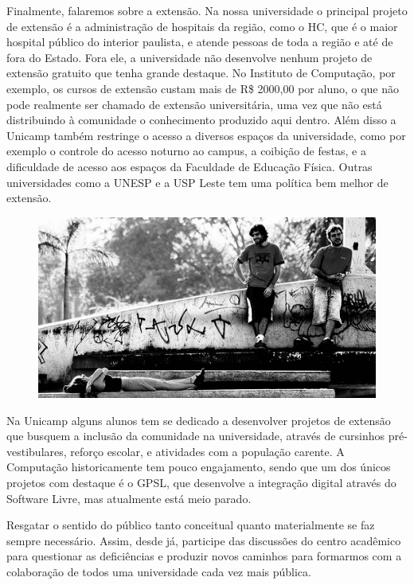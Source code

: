 Finalmente, falaremos sobre a extensão. Na nossa universidade o principal
projeto de extensão é a administração de hospitais da região, como o HC, que
é o maior hospital público do interior paulista, e atende pessoas de toda
a região e até de fora do Estado. Fora ele, a universidade não desenvolve nenhum
projeto de extensão gratuito que tenha grande destaque. No Instituto de
Computação, por exemplo, os cursos de extensão custam mais de R\$ 2000,00 por
aluno, o que não pode realmente ser chamado de extensão universitária, uma vez
que não está distribuindo à comunidade o conhecimento produzido aqui dentro.
Além disso a Unicamp também restringe o acesso a diversos espaços da
universidade, como por exemplo o controle do acesso noturno ao campus,
a coibição de festas, e a dificuldade de acesso aos espaços da Faculdade de
Educação Física. Outras universidades como a UNESP e a USP Leste tem uma
política bem melhor de extensão.
\begin{figure}[h!]
    \centering
    \includegraphics[scale=0.55,keepaspectratio=true]{img/imgs/4-para_pensar/-024.jpg}
\end{figure}
Na Unicamp alguns alunos tem se dedicado
a desenvolver projetos de extensão que busquem a inclusão da comunidade na
universidade, através de cursinhos pré-vestibulares, reforço escolar,
e atividades com a população carente. A Computação historicamente tem pouco
engajamento, sendo que um dos únicos projetos com destaque é o GPSL, que
desenvolve a integração digital através do Software Livre, mas atualmente está
meio parado.

Resgatar o sentido do público tanto conceitual quanto materialmente se faz
sempre necessário. Assim, desde já, participe das discussões do centro acadêmico
para questionar as deficiências e produzir novos caminhos para formarmos com
a colaboração de todos uma universidade cada vez mais pública.

